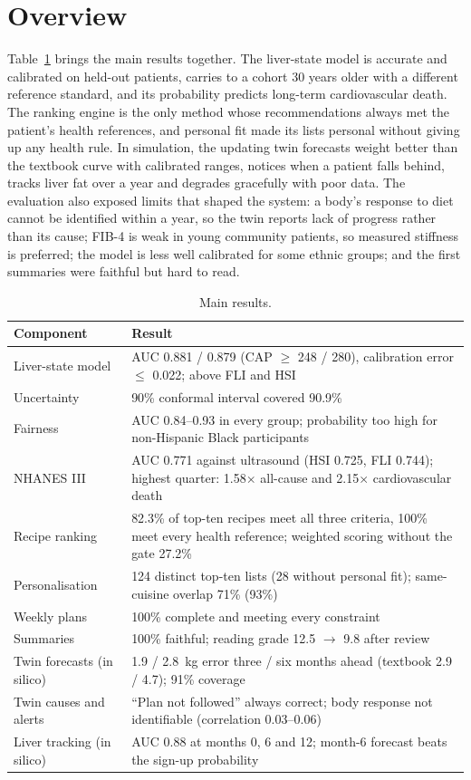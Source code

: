 \section{Overview}
\label{sec:r_overview}

Table~\ref{tab:r_overview} brings the main results together. The liver-state
model is accurate and calibrated on held-out patients, carries to a cohort 30
years older with a different reference standard, and its probability
predicts long-term cardiovascular death. The ranking engine is the only method
whose recommendations always met the patient's health references, and personal
fit made its lists personal without giving up any health rule. In simulation,
the updating twin forecasts weight better than the textbook curve with
calibrated ranges, notices when a patient falls behind, tracks liver fat over a
year and degrades gracefully with poor data. The evaluation also exposed limits
that shaped the system: a body's response to diet cannot be identified within a
year, so the twin reports lack of progress rather than its cause; FIB-4 is weak
in young community patients, so measured stiffness is preferred; the model is
less well calibrated for some ethnic groups; and the first summaries were
faithful but hard to read.

\begin{table}[htbp]
\centering
\caption{Main results.}
\label{tab:r_overview}
\begin{tabular}{p{4.2cm}p{9.8cm}}
\toprule
Component & Result \\
\midrule
Liver-state model & AUC 0.881 / 0.879 (CAP $\geq$ 248 / 280), calibration error $\leq$ 0.022; above FLI and HSI \\
Uncertainty & 90\% conformal interval covered 90.9\% \\
Fairness & AUC 0.84--0.93 in every group; probability too high for non-Hispanic Black participants \\
NHANES III & AUC 0.771 against ultrasound (HSI 0.725, FLI 0.744); highest quarter: 1.58$\times$ all-cause and 2.15$\times$ cardiovascular death \\
Recipe ranking & 82.3\% of top-ten recipes meet all three criteria, 100\% meet every health reference; weighted scoring without the gate 27.2\% \\
Personalisation & 124 distinct top-ten lists (28 without personal fit); same-cuisine overlap 71\% (93\%) \\
Weekly plans & 100\% complete and meeting every constraint \\
Summaries & 100\% faithful; reading grade 12.5 $\to$ 9.8 after review \\
Twin forecasts (in silico) & 1.9 / 2.8~kg error three / six months ahead (textbook 2.9 / 4.7); 91\% coverage \\
Twin causes and alerts & ``Plan not followed'' always correct; body response not identifiable (correlation 0.03--0.06) \\
Liver tracking (in silico) & AUC 0.88 at months 0, 6 and 12; month-6 forecast beats the sign-up probability \\
\bottomrule
\end{tabular}
\end{table}

